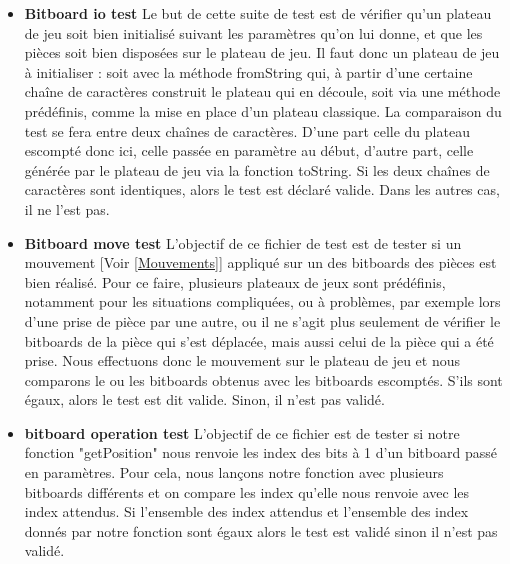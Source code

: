 \documentclass{article}
\begin{document}
\begin{itemize}
    \item \textbf{Bitboard io test}\newline 
    Le but de cette suite de test est de vérifier qu'un plateau de jeu soit bien initialisé suivant les paramètres qu'on lui donne, et que les pièces soit bien disposées sur le plateau de jeu.\newline
    Il faut donc un plateau de jeu à initialiser : soit avec la méthode fromString qui, à partir d'une certaine chaîne de caractères construit le plateau qui en découle, soit via une méthode prédéfinis, comme la mise en place d'un plateau classique.\newline
    La comparaison du test se fera entre deux chaînes de caractères. 
    D'une part celle du plateau escompté donc ici, celle passée en paramètre au début, d'autre part, celle générée par le plateau de jeu via la fonction toString.
    Si les deux chaînes de caractères sont identiques, alors le test est déclaré valide.
    Dans les autres cas, il ne l'est pas.\newline
    
    
    \item \textbf{Bitboard move test} \newline
    L'objectif de ce fichier de test est de tester si un mouvement [Voir \ref{Mouvements}] appliqué sur un des bitboards \cite{Bitboards} des pièces est bien réalisé.\newline
    Pour ce faire, plusieurs plateaux de jeux sont prédéfinis, notamment pour les situations compliquées, ou à problèmes, par exemple lors d'une prise de pièce par une autre, ou il ne s'agit plus seulement de vérifier le bitboards de la pièce qui s'est déplacée, mais aussi celui de la pièce qui a été prise.\newline
    Nous effectuons donc le mouvement sur le plateau de jeu et nous comparons le ou les bitboards obtenus avec les bitboards escomptés.\newline
    S'ils sont égaux, alors le test est dit valide.
    Sinon, il n'est pas validé.\newline
    
    \item \textbf{bitboard operation test}\newline
    L'objectif de ce fichier est de tester si notre fonction "getPosition" nous renvoie les index des bits à 1 d'un bitboard passé en paramètres.\newline
    Pour cela, nous lançons notre fonction avec plusieurs bitboards différents et on compare les index qu'elle nous renvoie avec les index attendus.\newline
    Si l'ensemble des index attendus et l'ensemble des index donnés par notre fonction sont égaux alors le test est validé sinon il n'est pas validé.\newline
    

\end{itemize}
\end{document}
